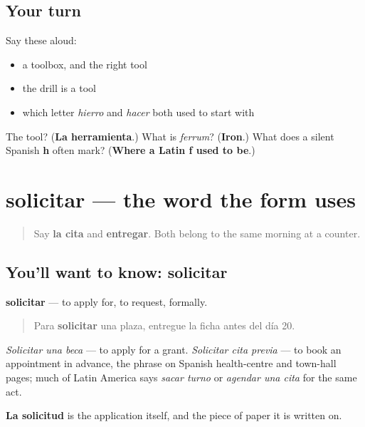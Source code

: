 \subsection*{Your turn}
Say these aloud:

\begin{itemize}
\raggedright
  \item a toolbox, and the right tool
  \item the drill is a tool
  \item which letter \emph{hierro} and \emph{hacer} both used to start with
\end{itemize}

\begin{tcolorbox}[breakable,colback=teal!4,colframe=teal!35!black,title={Before you move on}]
The tool? (\textbf{La herramienta}.) What is \emph{ferrum}? (\textbf{Iron}.) What does a silent Spanish \textbf{h} often mark? (\textbf{Where a Latin f used to be}.)
\end{tcolorbox}
\section[solicitar]{solicitar — the word the form uses}

\label{lesson:ES-C460-solicitar}



\begin{quote}
Say \textbf{la cita} and \textbf{entregar}. Both belong to the same morning at a counter.
\end{quote}

\subsection*{You'll want to know: solicitar}
\textbf{solicitar} — to apply for, to request, formally.

\begin{quote}
Para \textbf{solicitar} una plaza, entregue la ficha antes del día 20.
\end{quote}

\emph{Solicitar una beca} — to apply for a grant. \emph{Solicitar cita previa} — to book an appointment in advance, the phrase on Spanish health-centre and town-hall pages; much of Latin America says \emph{sacar turno} or \emph{agendar una cita} for the same act.

\textbf{La solicitud} is the application itself, and the piece of paper it is written on.

